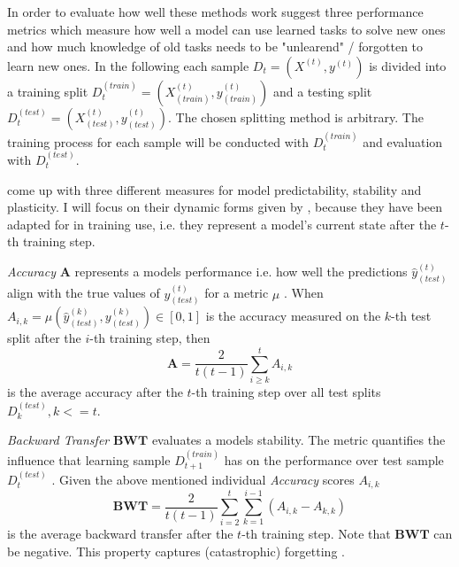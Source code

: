 In order to evaluate how well these methods work \citeauthor{lopezpaz2022gradientepisodicmemorycontinual} \cite{lopezpaz2022gradientepisodicmemorycontinual} suggest three performance metrics which measure how well a model can use learned tasks to solve new ones and how much knowledge of old tasks needs to be "unlearend" / forgotten to learn new ones.
In the following each sample $D_t = (X^{(t)}, y^{(t)})$ is divided into a training split $D_t^{(train)} = (X^{(t)}_{(train)}, y^{(t)}_{(train)})$ and a testing split $D_t^{(test)} = (X^{(t)}_{(test)}, y^{(t)}_{(test)})$. The chosen splitting method is arbitrary. The training process for each sample will be conducted with $D_t^{(train)}$ and evaluation with $D_t^{(test)}$.

\citeauthor{lopezpaz2022gradientepisodicmemorycontinual} \cite{lopezpaz2022gradientepisodicmemorycontinual} come up with three different measures for model predictability, stability and plasticity. I will focus on their dynamic forms given by \citeauthor{díazrodríguez2018dontforgetforgettingnew} \cite{díazrodríguez2018dontforgetforgettingnew}, because they have been adapted for in training use, i.e. they represent a model's current state after the $t$-th training step.

\textit{Accuracy} $\mathbf{A}$ represents a models performance i.e. how well the predictions $\hat{y}^{(t)}_{(test)}$ align with the true values of $y^{(t)}_{(test)}$ for a metric $\mu$ . When $A_{i,k} = \mu(\hat{y}_{(test)}^{(k)}, y_{(test)}^{(k)}) \in [0,1]$ is the accuracy measured on the $k$-th test split after the $i$-th training step, then
\begin{equation}
	\mathbf{A} = \frac{2}{t(t-1)}\sum_{i \geq k }^{t} A_{i,k}
\end{equation}
is the average accuracy after the $t$-th training step over all test splits $D_k^{(test)}, k <= t$.

\textit{Backward Transfer} $\mathbf{BWT}$ evaluates a models stability. The metric quantifies the influence that learning sample $D_{t+1}^{(train)}$ has on the performance over test sample $D_t^{(test)}$ \cite{lopezpaz2022gradientepisodicmemorycontinual}. Given the above mentioned individual \textit{Accuracy} scores $A_{i,k}$
\begin{equation}
	\mathbf{BWT} = \frac{2}{t(t-1)} \sum_{i=2}^{t}\sum_{k=1}^{i-1}(A_{i,k}-A_{k,k})
\end{equation}
is the average backward transfer after the $t$-th training step. Note that $\mathbf{BWT}$ can be negative. This property captures (catastrophic) forgetting \cite{LW}.

